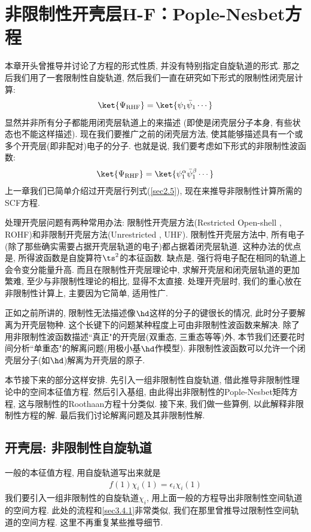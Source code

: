 \section{非限制性开壳层H-F：Pople-Nesbet方程}
本章开头曾推导并讨论了\hft 方程的形式性质, 
并没有特别指定自旋轨道的形式.  
那之后我们用了一套限制性自旋轨道,  
然后我们一直在研究如下形式的限制性闭壳层计算:
\begin{align}
	\ket{\Psi_\mathrm{RHF}} = \ket{\psi_1\bar{\psi}_1\cdots}
\end{align}
显然并非所有分子都能用闭壳层轨道上的来描述
(即使是闭壳层分子本身, 有些状态也不能这样描述). 
现在我们要推广之前的闭壳层方法, 
使其能够描述具有一个或多个开壳层(即非配对)电子的分子. 
也就是说, 
我们要考虑如下形式的非限制性波函数:
\begin{align}
	\ket{\Psi_\mathrm{RHF}} = \ket{\psi_1^\alpha\bar{\psi}_1^\beta\cdots}
\end{align}
上一章我们已简单介绍过开壳层行列式(\autoref{sec2.5}), 
现在来推导非限制性计算所需的SCF方程.


处理开壳层问题有两种常用办法: 限制性开壳层\hft 方法(Restricted Open-shell \hft,
ROHF)和非限制开壳层\hft 方法(Unrestricted \hft , UHF). 
限制性开壳层方法中, 
所有电子(除了那些确实需要占据开壳层轨道的电子)都占据着闭壳层轨道. 
这种办法的优点是, 
所得波函数是自旋算符$\ts^2$的本征函数. 
缺点是, 
强行将电子配在相同的轨道上会令变分能量升高. 
而且在限制性开壳层\hft 理论中, 
求解开壳层和闭壳层轨道的更加繁难, 
至少与非限制性\hft 理论的相比, 
显得不太直接. 
处理开壳层时, 
我们的重心放在非限制性计算上,  
主要因为它简单, 
适用性广.


正如之前所讲的, 
限制性\hft  无法描述像$\hd$这样的分子的键很长的情况, 
此时分子要解离为开壳层物种. 
这个长键下的问题某种程度上可由非限制性波函数来解决. 
除了用非限制性波函数描述``真正"的开壳层(双重态, 
三重态等等)外, 
本节我们还要花时间分析``单重态"的解离问题(用极小基$\hd$作模型). 
非限制性波函数可以允许一个闭壳层分子(如$\hd$)解离为开壳层的原子.


本节接下来的部分这样安排. 
先引入一组非限制性自旋轨道, 
借此推导非限制性\hft 理论中的空间本征值方程. 
然后引入基组, 
由此得出非限制性的Pople-Nesbet矩阵方程, 
这与限制性的Roothaan方程十分类似. 
接下来, 
我们做一些算例, 
以此解释非限制性方程的解. 
最后我们讨论解离问题及其非限制性解.

\subsection{开壳层\hft: 非限制性自旋轨道}
一般的\hft 本征值方程, 
用自旋轨道写出来就是
\begin{align}\label{3.308}
	f(1)\chi_i(1) = \epsilon_i \chi_i(1)
\end{align}
我们要引入一组非限制性的自旋轨道${\chi_i}$, 
用上面一般的\hft 方程导出非限制性空间轨道的空间方程. 
此处的流程和\autoref{sec3.4.1}非常类似, 
我们在那里曾推导过限制性空间轨道的空间方程. 
这里不再重复某些推导细节. 


